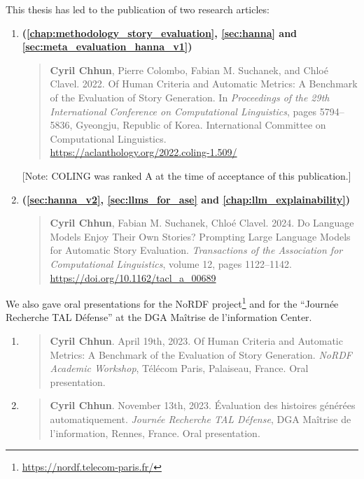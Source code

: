 This thesis has led to the publication of two research articles:

\begin{enumerate}
    \item \citep{chhun-etal-2022-human} \textbf{(\autoref{chap:methodology_story_evaluation}, \autoref{sec:hanna} and \autoref{sec:meta_evaluation_hanna_v1})}
    \begin{quote}
        \textbf{Cyril Chhun}, Pierre Colombo, Fabian M. Suchanek, and Chloé Clavel. 2022. Of Human Criteria and Automatic Metrics: A Benchmark of the Evaluation of Story Generation. In \textit{Proceedings of the 29th International Conference on Computational Linguistics}, pages 5794--5836, Gyeongju, Republic of Korea. International Committee on Computational Linguistics.\\\url{https://aclanthology.org/2022.coling-1.509/}
    \end{quote}
    [Note: COLING was ranked A at the time of acceptance of this publication.]
    \item \citep{chhun2024do} \textbf{(\autoref{sec:hanna_v2}, \autoref{sec:llms_for_ase} and \autoref{chap:llm_explainability})}
    \begin{quote}
        \textbf{Cyril Chhun}, Fabian M. Suchanek, Chloé Clavel. 2024. Do Language Models Enjoy Their Own Stories? Prompting Large Language Models for Automatic Story Evaluation. \textit{Transactions of the Association for Computational Linguistics}, volume 12, pages 1122--1142.\\\url{https://doi.org/10.1162/tacl_a_00689}
    \end{quote}
\end{enumerate}

We also gave oral presentations for the NoRDF project\footnote{\url{https://nordf.telecom-paris.fr/}} and for the ``Journée Recherche TAL Défense'' at the DGA Maîtrise de l'information Center.

\begin{enumerate}
    \item \begin{quote}
        \textbf{Cyril Chhun}. April 19th, 2023. Of Human Criteria and Automatic Metrics: A Benchmark of the Evaluation of Story Generation. \textit{NoRDF Academic Workshop}, Télécom Paris, Palaiseau, France. Oral presentation.
    \end{quote}
    \item \begin{quote}
        \textbf{Cyril Chhun}. November 13th, 2023. Évaluation des histoires générées automatiquement. \textit{Journée Recherche TAL Défense}, DGA Maîtrise de l'information, Rennes, France. Oral presentation.
    \end{quote}
\end{enumerate}